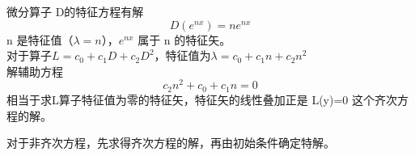 \begin{frame}	
	微分算子 D的特征方程有解
	\begin{equation*}
		D(e^{nx})=n e^{nx}
	\end{equation*}	
	n 是特征值（$\lambda=n$），$e^{nx}$ 属于 n 的特征矢。\\
	对于算子$L= c_0 + c_1D +c_2D^2 $，特征值为$\lambda=c_0 + c_1n +c_2n^2$ \\
	解辅助方程
	\begin{equation*}
		c_2 n^2 + c_0 + c_1 n =0
	\end{equation*}	
	相当于求L算子特征值为零的特征矢，特征矢的线性叠加正是 L(y)=0 这个齐次方程的解。
\end{frame}

\begin{frame}
	对于非齐次方程，先求得齐次方程的解，再由初始条件确定特解。
\end{frame}
